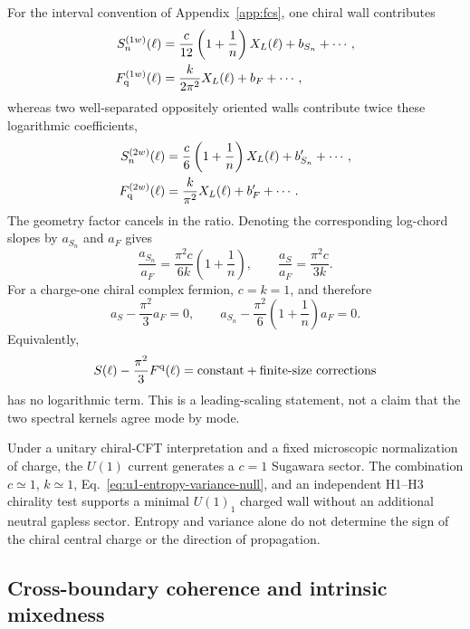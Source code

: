 \documentclass[aps,prx,onecolumn,nofootinbib,superscriptaddress,longbibliography]{revtex4-2}
\begin{document}
For the interval convention of Appendix~\ref{app:fcs}, one chiral wall contributes
\begin{align}
 S_n^{(1w)}(\ell)
 &=\frac{c}{12}\left(1+\frac1n\right)X_L(\ell)+b_{S_n}+\cdots,\\
 F_{\rm q}^{(1w)}(\ell)
 &=\frac{k}{2\pi^2}X_L(\ell)+b_F+\cdots,
 \label{eq:one-wall-entropy-variance}
\end{align}
whereas two well-separated oppositely oriented walls contribute twice these logarithmic
coefficients,
\begin{align}
 S_n^{(2w)}(\ell)
 &=\frac{c}{6}\left(1+\frac1n\right)X_L(\ell)+b_{S_n}'+\cdots,\\
 F_{\rm q}^{(2w)}(\ell)
 &=\frac{k}{\pi^2}X_L(\ell)+b_F'+\cdots.
 \label{eq:two-wall-entropy-variance}
\end{align}
The geometry factor cancels in the ratio.  Denoting the corresponding log-chord slopes by
$a_{S_n}$ and $a_F$ gives
\begin{equation}
 \frac{a_{S_n}}{a_F}
 =\frac{\pi^2c}{6k}\left(1+\frac1n\right),
 \qquad
 \frac{a_S}{a_F}=\frac{\pi^2c}{3k}.
 \label{eq:general-entropy-variance-ratio}
\end{equation}
For a charge-one chiral complex fermion, $c=k=1$, and therefore
\begin{equation}
 a_S-\frac{\pi^2}{3}a_F=0,\qquad
 a_{S_n}-\frac{\pi^2}{6}\left(1+\frac1n\right)a_F=0.
 \label{eq:u1-entropy-variance-null}
\end{equation}
Equivalently,
\begin{equation}
 S(\ell)-\frac{\pi^2}{3}F^{\rm q}(\ell)
 =\text{constant}+\text{finite-size corrections}
 \label{eq:entropy-variance-constant-residual}
\end{equation}
has no logarithmic term.  This is a leading-scaling statement, not a claim that the two
spectral kernels agree mode by mode.

Under a unitary chiral-CFT interpretation and a fixed microscopic normalization of charge,
the $U(1)$ current generates a $c=1$ Sugawara sector.  The combination $c\simeq1$,
$k\simeq1$, Eq.~\eqref{eq:u1-entropy-variance-null}, and an independent H1--H3 chirality
test supports a minimal $U(1)_1$ charged wall without an additional neutral gapless
sector.  Entropy and variance alone do not determine the sign of the chiral central charge
or the direction of propagation.

\subsection{Cross-boundary coherence and intrinsic mixedness}
\end{document}
